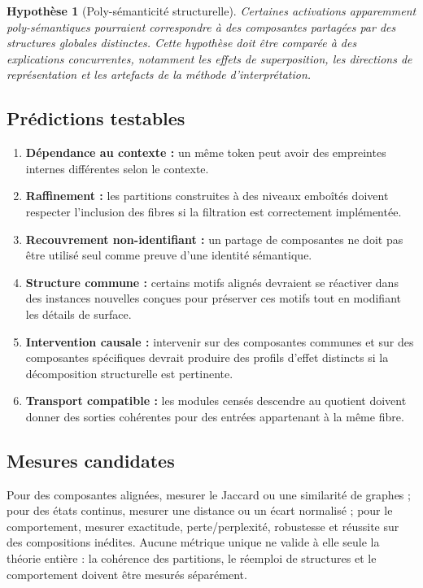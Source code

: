 \documentclass[11pt,a4paper]{article}
\newtheorem{hypothesis}[definition]{Hypothèse}
\theoremstyle{remark}
\newcommand{\1}{\mathbf 1}
\begin{document}
\begin{hypothesis}[Poly-sémanticité structurelle]
Certaines activations apparemment poly-sémantiques pourraient correspondre à des composantes partagées par des structures globales distinctes. Cette hypothèse doit être comparée à des explications concurrentes, notamment les effets de superposition, les directions de représentation et les artefacts de la méthode d'interprétation.
\end{hypothesis}

\subsection{Prédictions testables}
\begin{enumerate}[label=\textbf{P\arabic*.}]
  \item \textbf{Dépendance au contexte :} un même token peut avoir des empreintes internes différentes selon le contexte.
  \item \textbf{Raffinement :} les partitions construites à des niveaux emboîtés doivent respecter l'inclusion des fibres si la filtration est correctement implémentée.
  \item \textbf{Recouvrement non-identifiant :} un partage de composantes ne doit pas être utilisé seul comme preuve d'une identité sémantique.
  \item \textbf{Structure commune :} certains motifs alignés devraient se réactiver dans des instances nouvelles conçues pour préserver ces motifs tout en modifiant les détails de surface.
  \item \textbf{Intervention causale :} intervenir sur des composantes communes et sur des composantes spécifiques devrait produire des profils d'effet distincts si la décomposition structurelle est pertinente.
  \item \textbf{Transport compatible :} les modules censés descendre au quotient doivent donner des sorties cohérentes pour des entrées appartenant à la même fibre.
\end{enumerate}

\subsection{Mesures candidates}
Pour des composantes alignées, mesurer le Jaccard ou une similarité de graphes ; pour des états continus, mesurer une distance ou un écart normalisé ; pour le comportement, mesurer exactitude, perte/perplexité, robustesse et réussite sur des compositions inédites. Aucune métrique unique ne valide à elle seule la théorie entière : la cohérence des partitions, le réemploi de structures et le comportement doivent être mesurés séparément.
\end{document}
